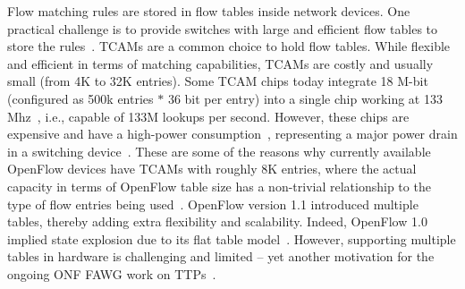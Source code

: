 Flow matching rules are stored in flow tables inside network devices.
One practical challenge is to provide switches with large and efficient flow tables to store the 
rules~\cite{appelman2012}. TCAMs are a common choice to hold flow tables. While flexible 
and efficient in terms of matching capabilities, TCAMs are costly and usually small (from 4K to 32K 
entries). Some TCAM chips today integrate 18 M-bit (configured as 500k entries $*$ 36 bit per entry) 
into a single chip working at 133 Mhz~\cite{kannan2013}, i.e., capable of 133M lookups 
per second. However, these chips are expensive and have a high-power consumption~\cite{liao2012}, 
representing a major power drain in a switching device~\cite{agrawal2006}. These are some of the reasons 
why currently available OpenFlow devices have TCAMs with roughly 8K entries, where the actual capacity 
in terms of OpenFlow table size has a non-trivial relationship to the type of flow entries being used~\cite{owens2013,salisbury2012}. OpenFlow version 1.1 introduced multiple tables, 
thereby adding extra flexibility and scalability. Indeed, OpenFlow 1.0 implied state explosion due to 
its flat table model~\cite{onf2013}. However, supporting multiple tables in hardware is challenging 
and limited -- yet another motivation for the ongoing ONF FAWG work on TTPs~\cite{onf2013}.


